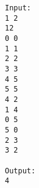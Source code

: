 \begin{verbatim}
Input:
1 2
12
0 0
1 1
2 2
3 3
4 5
5 5
4 2
1 4
0 5
5 0
2 3
3 2

Output:
4
\end{verbatim}